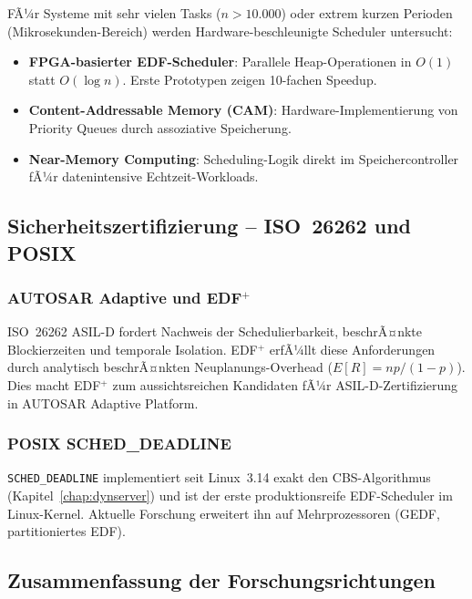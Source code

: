 ﻿\documentclass[a4paper,12pt]{report}
\theoremstyle{definition}
\begin{document}
FÃ¼r Systeme mit sehr vielen Tasks ($n > 10.000$) oder extrem kurzen Perioden
(Mikrosekunden-Bereich) werden Hardware-beschleunigte Scheduler untersucht:

\begin{itemize}
	\item \textbf{FPGA-basierter EDF-Scheduler}: Parallele Heap-Operationen
	      in $O(1)$ statt $O(\log n)$. Erste Prototypen zeigen 10-fachen
	      Speedup.
	\item \textbf{Content-Addressable Memory (CAM)}: Hardware-Implementierung
	      von Priority Queues durch assoziative Speicherung.
	\item \textbf{Near-Memory Computing}: Scheduling-Logik direkt im
	      Speichercontroller fÃ¼r datenintensive Echtzeit-Workloads.
\end{itemize}

\subsection{Sicherheitszertifizierung -- ISO~26262 und POSIX}

\subsubsection{AUTOSAR Adaptive und EDF$^+$}

ISO~26262 ASIL-D fordert Nachweis der Schedulierbarkeit, beschrÃ¤nkte
Blockierzeiten und temporale Isolation. EDF$^+$ \cite{Epp2026} erfÃ¼llt diese
Anforderungen durch analytisch beschrÃ¤nkten Neuplanungs-Overhead
($E[R] = np/(1-p)$). Dies macht EDF$^+$ zum aussichtsreichen Kandidaten
fÃ¼r ASIL-D-Zertifizierung in AUTOSAR Adaptive Platform.

\subsubsection{POSIX SCHED\_DEADLINE}

\texttt{SCHED\_DEADLINE} implementiert seit Linux~3.14 exakt den CBS-Algorithmus
(Kapitel~\ref{chap:dynserver}) und ist der erste produktionsreife EDF-Scheduler
im Linux-Kernel. Aktuelle Forschung erweitert ihn auf Mehrprozessoren
(GEDF, partitioniertes EDF).

\subsection{Zusammenfassung der Forschungsrichtungen}
\end{document}
